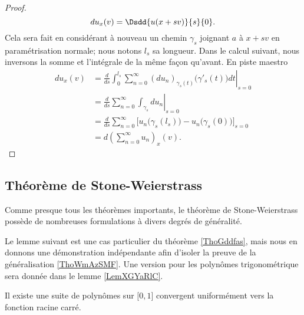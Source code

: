 \begin{proof}
\begin{equation}
        du_x(v)=\Dsdd{ u(x+sv) }{s}{0}.
    \end{equation}
    Cela sera fait en considérant à nouveau un chemin \( \gamma_s \) joignant \( a\) à \( x+sv\) en paramétrisation normale; nous notons \( l_s\) sa longueur. Dans le calcul suivant, nous inversons la somme et l'intégrale de la même façon qu'avant. En piste maestro
    \begin{subequations}
        \begin{align}
            du_x(v)&=\frac{ d  }{ d s }\left.\int_0^{l_s}\sum_{n=0}^{\infty}(du_n)_{\gamma_s(t)}\big( \gamma'_s(t) \big)dt\right|_{s=0}\\
            &=\frac{ d  }{ d s }\left.\sum_{n=0}^{\infty}\int_{\gamma_s}du_n\right|_{s=0}\\
            &=\frac{ d  }{ d s }\sum_{n=0}^{\infty}\Big[ u_n\big( \gamma_s(l_s)\big)-u_n\big( \gamma_s(0) \big)  \Big]_{s=0}\\
            &=d\left( \sum_{n=0}^{\infty}u_n \right)_x(v).
        \end{align}
    \end{subequations}
\end{proof}

\subsection{Théorème de Stone-Weierstrass}

Comme presque tous les théorèmes importants, le théorème de Stone-Weierstrass possède de nombreuses formulations à divers degrés de généralité.

Le lemme suivant est une cas particulier du théorème \ref{ThoGddfas}, mais nous en donnons une démonstration indépendante afin d'isoler la preuve de la généralisation \ref{ThoWmAzSMF}. Une version pour les polynômes trigonométrique sera donnée dans le lemme \ref{LemXGYaRlC}.

\begin{lemma}       \label{LemYdYLXb}
    Il existe une suite de polynômes sur \( \mathopen[ 0 , 1 \mathclose]\) convergent uniformément vers la fonction racine carré.
\end{lemma}

